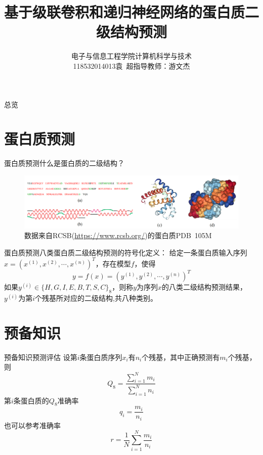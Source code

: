 \documentclass[table]{beamer}
\title{基于级联卷积和递归神经网络的蛋白质二级结构预测}
\author{电子与信息工程学院\qquad 计算机科学与技术\\
118532014013\qquad 袁\ 超\qquad 指导教师：游文杰}
\date{}
\begin{document}
\frame{\titlepage}

\begin{frame}{总览}
	\tableofcontents
\end{frame}


\section{蛋白质预测}
\begin{frame}{蛋白质预测}{什么是蛋白质的二级结构？}
\begin{figure}[htbp]
\includegraphics[width=1\textwidth]{pic/ppt105M}
\caption{数据来自RCSB(\url{https://www.rcsb.org/})的蛋白质PDB\ 105M}
\end{figure}
\end{frame}

\begin{frame}{蛋白质预测}{八类蛋白质二级结构预测的符号化定义：}
给定一条蛋白质输入序列$x=(x^{(1)},x^{(2)},\cdots,x^{(n)})^T$，存在模型$f$，使得
\begin{equation}
	y=f(x)=(y^{(1)},y^{(2)},\cdots,y^{(n)})^T
\end{equation}
如果$y^{(i)}\in \{H,G,I,E,B,T,S,C\}_8$，则称$y$为序列$x$的八类二级结构预测结果，$y^{(i)}$为第$i$个残基所对应的二级结构,共八种类别。
\end{frame}

\section{预备知识}
\begin{frame}{预备知识}{预测评估}
设第$i$条蛋白质序列$x_i$有$n_i$个残基，其中正确预测有$m_i$个残基，则
\begin{equation}
	Q_8=\frac{\sum\limits^{N}_{i=1}m_i}{\sum\limits^{N}_{i=1}n_i}
\end{equation}
第$i$条蛋白质的$Q_8$准确率
\begin{equation}
	q_i = \frac{m_i}{n_i}
\end{equation}
也可以参考准确率
\begin{equation}
	r=\frac{1}{N}\sum\limits^{N}_{i=1}\frac{m_i}{n_i}
\end{equation}
\end{frame}
\end{document}
